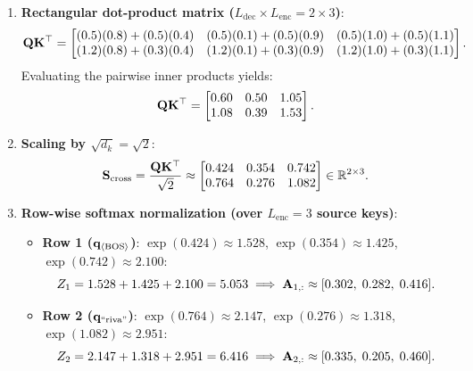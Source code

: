 \documentclass[../../main.tex]{subfiles}
\begin{document}
\begin{enumerate}
    \item \textbf{Rectangular dot-product matrix ($L_{\text{dec}} \times L_{\text{enc}} = 2 \times 3$)}:
    \begin{equation}
    \mathbf{Q} \mathbf{K}^\top = \begin{bmatrix}
    (0.5)(0.8) + (0.5)(0.4) & (0.5)(0.1) + (0.5)(0.9) & (0.5)(1.0) + (0.5)(1.1) \\
    (1.2)(0.8) + (0.3)(0.4) & (1.2)(0.1) + (0.3)(0.9) & (1.2)(1.0) + (0.3)(1.1)
    \end{bmatrix}.
    \end{equation}
    Evaluating the pairwise inner products yields:
    \begin{equation}
    \mathbf{Q} \mathbf{K}^\top = \begin{bmatrix}
    0.60 & 0.50 & 1.05 \\
    1.08 & 0.39 & 1.53
    \end{bmatrix}.
    \end{equation}
    \item \textbf{Scaling by $\sqrt{d_k} = \sqrt{2}$}:
    \begin{equation}
    \label{eq:cross_scaled_scores}
    \mathbf{S}_{\text{cross}} = \frac{\mathbf{Q} \mathbf{K}^\top}{\sqrt{2}} \approx \begin{bmatrix}
    0.424 & 0.354 & 0.742 \\
    0.764 & 0.276 & 1.082
    \end{bmatrix} \in \mathbb{R}^{2 \times 3}.
    \end{equation}
    \item \textbf{Row-wise softmax normalization (over $L_{\text{enc}} = 3$ source keys)}:
    \begin{itemize}
        \item \textbf{Row 1 ($\mathbf{q}_{\langle\text{BOS}\rangle}$)}:
        $\exp(0.424) \approx 1.528$, $\exp(0.354) \approx 1.425$, $\exp(0.742) \approx 2.100$:
        \begin{equation}
        Z_1 = 1.528 + 1.425 + 2.100 = 5.053 \implies
        \mathbf{A}_{1, :} \approx [0.302, \; 0.282, \; 0.416].
        \end{equation}
        \item \textbf{Row 2 ($\mathbf{q}_{\text{``riva''}}$)}:
        $\exp(0.764) \approx 2.147$, $\exp(0.276) \approx 1.318$, $\exp(1.082) \approx 2.951$:
        \begin{equation}
        Z_2 = 2.147 + 1.318 + 2.951 = 6.416 \implies
        \mathbf{A}_{2, :} \approx [0.335, \; 0.205, \; 0.460].
        \end{equation}

\end{itemize}
\end{enumerate}
\end{document}
